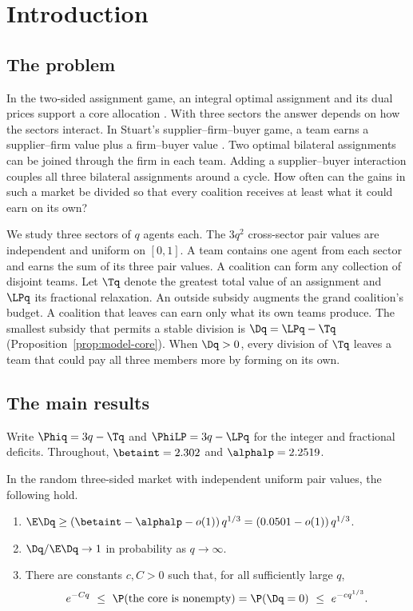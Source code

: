 \section{Introduction}\label{sec:intro}

\subsection{The problem}\label{sec:intro-problem}

In the two-sided assignment game, an integral optimal assignment and its dual prices
support a core allocation \cite{ShapleyShubik71}. With three sectors the answer depends
on how the sectors interact. In Stuart's supplier--firm--buyer game, a team earns a
supplier--firm value plus a firm--buyer value \cite{Stuart97}. Two optimal bilateral
assignments can be joined through the firm in each team. Adding a supplier--buyer
interaction couples all three bilateral assignments around a cycle. How often can the
gains in such a market be divided so that every coalition receives at least what it
could earn on its own?

We study three sectors of $q$ agents each. The $3q^2$ cross-sector pair values are
independent and uniform on $[0,1]$. A team contains one agent from each sector and earns
the sum of its three pair values. A coalition can form any collection of disjoint teams.
Let $\Tq$ denote the greatest total value of an assignment and $\LPq$ its fractional
relaxation. An outside subsidy augments the grand coalition's budget. A coalition that
leaves can earn only what its own teams produce. The smallest subsidy that permits a
stable division is $\Dq=\LPq-\Tq$ (Proposition~\ref{prop:model-core}).
When $\Dq>0$, every division of $\Tq$ leaves a team that could pay all three members
more by forming on its own.

\newpage
\subsection{The main results}\label{sec:intro-main}

Write $\Phiq=3q-\Tq$ and $\PhiLP=3q-\LPq$ for the integer and fractional deficits.
Throughout, $\betaint=2.302$ and $\alphalp=2.2519$.

\begin{theorem}\label{thm:main}
In the random three-sided market with independent uniform pair values, the following hold.
\begin{enumerate}
\item[(i)] $\E\Dq\ge(\betaint-\alphalp-o(1))\,q^{1/3}=(0.0501-o(1))\,q^{1/3}$.
\item[(ii)] $\Dq/\E\Dq\to1$ in probability as $q\to\infty$.
\item[(iii)] There are constants $c,C>0$ such that, for all sufficiently large $q$,
\[
 e^{-Cq}\ \le\ \P(\text{the core is nonempty})=\P(\Dq=0)\ \le\ e^{-c q^{1/3}} .
\]
\end{enumerate}
\end{theorem}

